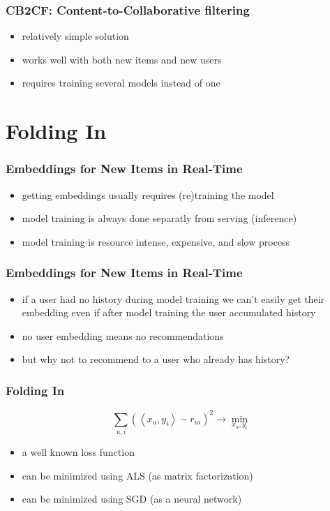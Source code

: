 \documentclass[t]{beamer}
\begin{document}
\begin{frame}
  \frametitle{CB2CF: Content-to-Collaborative filtering}
  \begin{itemize}
  \item relatively simple solution
  \item works well with both new items and new users
  \item requires training several models instead of one  
  \end{itemize}
\end{frame}
\section{Folding In}
\begin{frame}
  \frametitle{Embeddings for New Items in Real-Time}
  \begin{itemize}
  \item getting embeddings usually requires (re)training the model
  \item model training is always done separatly from serving (inference)
  \item model training is resource intense, expensive, and slow process  
  \end{itemize}
\end{frame}
\begin{frame}
  \frametitle{Embeddings for New Items in Real-Time}
  \begin{itemize}
  \item if a user had no history during model training we can't easily get their embedding even if after model training the user accumulated history
  \item no user embedding means no recommendations
  \item but why not to recommend to a user who already has history?
  \end{itemize}
\end{frame}
\begin{frame}
  \frametitle{Folding In}
  $$\sum\limits_{u,i}\left(\left<x_u,y_i\right>-r_{ui}\right)^2\longrightarrow\min_{x_u,y_i}$$
  \begin{itemize}
  \item a well known loss function
  \item can be minimized using ALS (as matrix factorization)
  \item can be minimized using SGD (as a neural network)
  \end{itemize}  
\end{frame}
\end{document}
